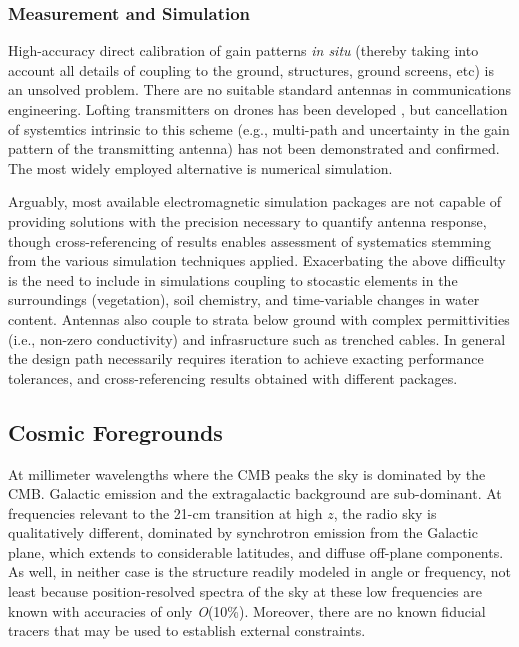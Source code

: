 \subsubsection{Measurement and Simulation}

High-accuracy direct calibration of gain patterns {\it in situ} (thereby taking into account all details of coupling to the ground, structures, ground screens, etc) is an unsolved problem.  There are no suitable standard antennas in communications engineering.  Lofting transmitters on drones has been developed \cite{jacobs17}, but cancellation of systemtics intrinsic to this scheme (e.g., multi-path and uncertainty in the gain pattern of the transmitting antenna) has not been demonstrated and confirmed.  The most widely employed alternative is numerical simulation.

Arguably, most available electromagnetic simulation packages are not capable of providing solutions with the precision necessary to quantify antenna response, though cross-referencing of results enables assessment of systematics stemming from the various simulation techniques applied.  Exacerbating the above difficulty is the need to include in simulations coupling to stocastic elements in the surroundings (vegetation), soil chemistry, and time-variable changes in water content. Antennas also couple to strata below ground with complex permittivities (i.e., non-zero conductivity) and infrasructure such as trenched cables.  In general the design path necessarily requires iteration to achieve exacting performance tolerances, and cross-referencing results obtained with different packages.   

\subsection{Cosmic Foregrounds}

At millimeter wavelengths where the CMB peaks the sky is dominated by the CMB. Galactic emission and the extragalactic background are sub-dominant.  At frequencies relevant to the 21-cm transition at high $z$, the radio sky is qualitatively different, dominated by synchrotron emission from the Galactic plane, which extends to considerable latitudes, and diffuse off-plane components.  As well, in neither case is the structure readily modeled in angle or frequency, not least because position-resolved spectra of the sky at these low frequencies are known with accuracies of only {\it O}(10\%).  Moreover, there are no known fiducial tracers that may be used to establish external constraints.

